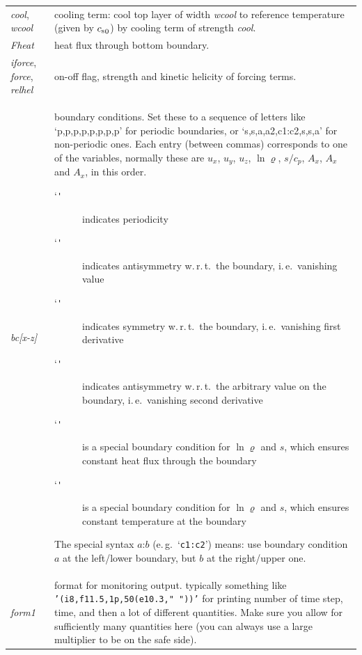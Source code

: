 \documentclass[12pt,twoside,notitlepage,a4paper]{article}
\makeatletter
\newcommand{\code}[1]{\texttt{#1}}
\newcommand{\var}[1]{\textsl{#1}\index{#1@\emph{#1}}\/}
\newcommand{\option}[1]{`\code{#1}'\index{#1@\emph{`#1'} option}}
\newcommand{\cs}            {c_{\rm s}}
\makeatother
\begin{document}
\begin{longtable}{lp{}}
  \var{cool}, \var{wcool}
               & cooling term: cool top layer of width \var{wcool} to
                 reference temperature (given by ${\cs}_0$) by cooling term
                 of strength \var{cool}. \\
  \var{Fheat}  & heat flux through bottom boundary. \\
  \var{iforce}, \var{force}, \var{relhel}
               & on-off flag, strength and kinetic helicity of forcing
                 terms. \\
  \var{bc[x-z]}
               & boundary conditions. Set these to a sequence of letters 
                 like `p,p,p,p,p,p,p,p' for periodic boundaries, or
                 `s,s,a,a2,c1:c2,s,s,a' for non-periodic ones.
                 Each entry (between commas) corresponds to one of the
                 variables, normally these are $u_x$, $u_y$, $u_z$,
                 $\ln\varrho$, $s/c_p$, $A_x$, $A_x$ and $A_x$, in this
                 order.
                 \begin{description}
                 \item[\option{p}] indicates periodicity
                 \item[\option{a}] indicates antisymmetry w.\,r.\,t.~the
                   boundary, i.\,e.~vanishing value
                 \item[\option{s}] indicates symmetry w.\,r.\,t.~the
                   boundary, i.\,e.~vanishing first derivative
                 \item[\option{a2}] indicates antisymmetry w.\,r.\,t.~the
                   arbitrary value on the boundary, i.\,e.~vanishing
                   second derivative
                 \item[\option{c1}] is a special boundary condition for
                   $\ln\varrho$ and $s$, which ensures constant heat flux
                   through the boundary
                 \item[\option{c2}] is a special boundary condition for
                   $\ln\varrho$ and $s$, which ensures constant
                   temperature at the boundary 
                 \end{description}
                 The special syntax $a$:$b$ (e.\,g.~`\code{c1:c2}') means: use
                 boundary condition $a$ at the left/lower boundary, but
                 $b$ at the right/upper one. 
                 \\
  \var{form1}  & format for monitoring output. typically something like
                 \code{'(i8,f11.5,1p,50(e10.3," "))'} for printing number
                 of time step, time, and then a lot of different
                 quantities. Make sure you allow for sufficiently many
                 quantities here (you can always use a large multiplier to
                 be on the safe side). \\
\bottomrule
\end{longtable}
\end{document}
